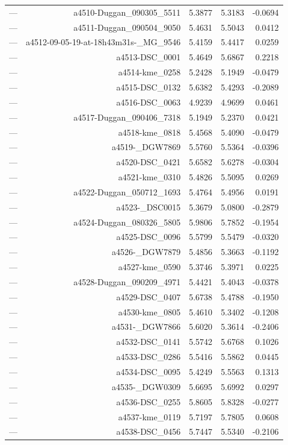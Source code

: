 \begin{table}[htbp]
\begin{tabular}{lrrrr}
— & a4510-Duggan_090305_5511 & 5.3877 & 5.3183 & -0.0694 \\
— & a4511-Duggan_090504_9050 & 5.4631 & 5.5043 & 0.0412 \\
— & a4512-09-05-19-at-18h43m31s-_MG_9546 & 5.4159 & 5.4417 & 0.0259 \\
— & a4513-DSC_0001 & 5.4649 & 5.6867 & 0.2218 \\
— & a4514-kme_0258 & 5.2428 & 5.1949 & -0.0479 \\
— & a4515-DSC_0132 & 5.6382 & 5.4293 & -0.2089 \\
— & a4516-DSC_0063 & 4.9239 & 4.9699 & 0.0461 \\
— & a4517-Duggan_090406_7318 & 5.1949 & 5.2370 & 0.0421 \\
— & a4518-kme_0818 & 5.4568 & 5.4090 & -0.0479 \\
— & a4519-_DGW7869 & 5.5760 & 5.5364 & -0.0396 \\
— & a4520-DSC_0421 & 5.6582 & 5.6278 & -0.0304 \\
— & a4521-kme_0310 & 5.4826 & 5.5095 & 0.0269 \\
— & a4522-Duggan_050712_1693 & 5.4764 & 5.4956 & 0.0191 \\
— & a4523-_DSC0015 & 5.3679 & 5.0800 & -0.2879 \\
— & a4524-Duggan_080326_5805 & 5.9806 & 5.7852 & -0.1954 \\
— & a4525-DSC_0096 & 5.5799 & 5.5479 & -0.0320 \\
— & a4526-_DGW7879 & 5.4856 & 5.3663 & -0.1192 \\
— & a4527-kme_0590 & 5.3746 & 5.3971 & 0.0225 \\
— & a4528-Duggan_090209_4971 & 5.4421 & 5.4043 & -0.0378 \\
— & a4529-DSC_0407 & 5.6738 & 5.4788 & -0.1950 \\
— & a4530-kme_0805 & 5.4610 & 5.3402 & -0.1208 \\
— & a4531-_DGW7866 & 5.6020 & 5.3614 & -0.2406 \\
— & a4532-DSC_0141 & 5.5742 & 5.6768 & 0.1026 \\
— & a4533-DSC_0286 & 5.5416 & 5.5862 & 0.0445 \\
— & a4534-DSC_0095 & 5.4249 & 5.5563 & 0.1313 \\
— & a4535-_DGW0309 & 5.6695 & 5.6992 & 0.0297 \\
— & a4536-DSC_0255 & 5.8605 & 5.8328 & -0.0277 \\
— & a4537-kme_0119 & 5.7197 & 5.7805 & 0.0608 \\
— & a4538-DSC_0456 & 5.7447 & 5.5340 & -0.2106 \\

\end{tabular}
\end{table}

